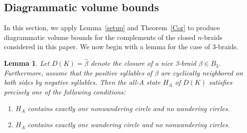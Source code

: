 \documentclass{article}
\newtheorem{lemma}{Lemma}[section]
\begin{document}
\subsection{Diagrammatic volume bounds}

In this section, we apply Lemma~\ref{setup} and Theorem~\ref{Cor} to produce diagrammatic volume bounds for the complements of the closed $n$-braids considered in this paper. We now begin with a lemma for the case of 3-braids. 

%

\begin{lemma} Let $D(K)=\widehat{\beta}$ denote the closure of a nice 3-braid $\beta \in B_{3}$. Furthermore, assume that the positive syllables of $\beta$ are cyclically neighbored on both sides by negative syllables. Then the all-A state $H_{A}$ of $D(K)$ satisfies precisely one of the following conditions:
\label{mylemma2}
\begin{enumerate}
\item[(1)] $H_{A}$ contains exactly one nonwandering circle and no wandering circles.
\item[(2)] $H_{A}$ contains exactly one wandering circle and no nonwandering circles. 
\end{enumerate}
\end{lemma}
\end{document}
